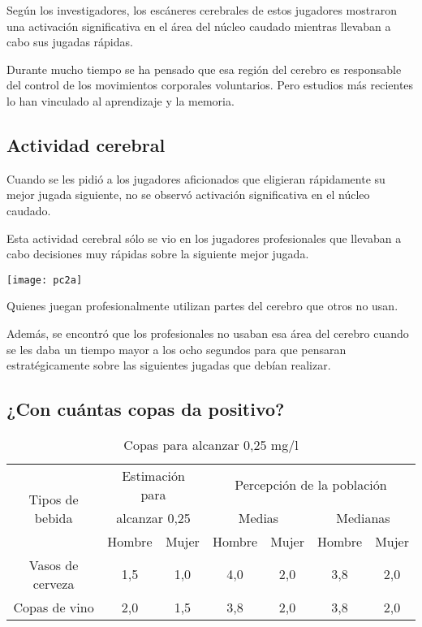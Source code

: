 \documentclass[12pt,a4paper]{report}
\begin{document}
Según los investigadores, los escáneres cerebrales de estos jugadores mostraron una activación significativa en el área del núcleo caudado mientras llevaban a cabo sus jugadas rápidas.

Durante mucho tiempo se ha pensado que esa región del cerebro es responsable del control de los movimientos corporales voluntarios. Pero estudios más recientes lo han vinculado al aprendizaje y la memoria.

\subsection{Actividad cerebral}

Cuando se les pidió a los jugadores aficionados que eligieran rápidamente su mejor jugada siguiente, no se observó activación significativa en el núcleo caudado.

Esta actividad cerebral sólo se vio en los jugadores profesionales que llevaban a cabo decisiones muy rápidas sobre la siguiente mejor jugada.
\newpage
\begin{center}
	\texttt{[image: pc2a]}
	\caption{\small Quienes juegan profesionalmente utilizan partes del cerebro que otros no usan.}
\end{center}

Además, se encontró que los profesionales no usaban esa área del cerebro cuando se les daba un tiempo mayor a los ocho segundos para que pensaran estratégicamente sobre las siguientes jugadas que debían realizar.

\subsection{¿Con cuántas copas da positivo?}	
	\begin{table}[H]
		\centering
		\caption{Copas para alcanzar 0,25 mg/l}\label{t1}
		\vspace{1.8cm}
		\begin{tabular}{|c|c|c|c|c|c|c|}
			\hline
			\multirow{3}{*}{Tipos de bebida} &\multicolumn{2}{|c|}{Estimación para}&\multicolumn{4}{|c|}{Percepción de la población}\\
			\cline{4-7}
			&\multicolumn{2}{|c|}{alcanzar 0,25}&\multicolumn{2}{|c|}{Medias}&\multicolumn{2}{|c|}{Medianas}\\
			\cline{2-7}
			& Hombre &Mujer&Hombre&Mujer&Hombre&Mujer\\
			\hline
			Vasos de cerveza& 1,5 & 1,0&4,0&2,0&3,8&2,0\\
			\hline
			Copas de vino& 2,0 & 1,5 &3,8&2,0&3,8&2,0\\
			\hline
		\end{tabular}
	\end{table}	
	
\end{document}
